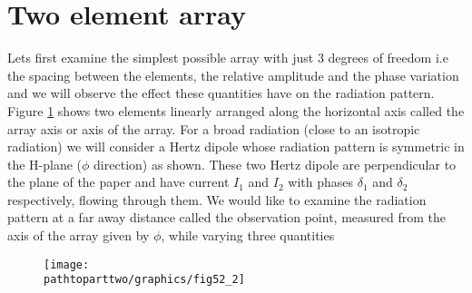 \section{Two element array}
Lets first examine the simplest possible array with just 3 degrees of freedom i.e the spacing between the elements, the relative amplitude and the phase variation and we will observe the effect these quantities have on the radiation pattern. Figure \ref{52.2} shows two elements linearly arranged along the horizontal axis called the array axis or axis of the array. For a broad radiation (close to an isotropic radiation) we will consider a Hertz dipole whose radiation pattern is symmetric in the H-plane ($\phi$ direction) as shown. These two Hertz dipole are perpendicular to the plane of the paper and have current $I_1$ and $I_2$ with phases $\delta_1$ and $\delta_2$ respectively, flowing through them. We would like to examine the radiation pattern at a far away distance called the observation point, measured from the axis of the array given by $\phi$, while varying three quantities
\begin{figure}[h]
\centering
\texttt{[image: \\pathtoparttwo/graphics/fig52\_2]}
\caption{}
\label{52.2}
\end{figure}

